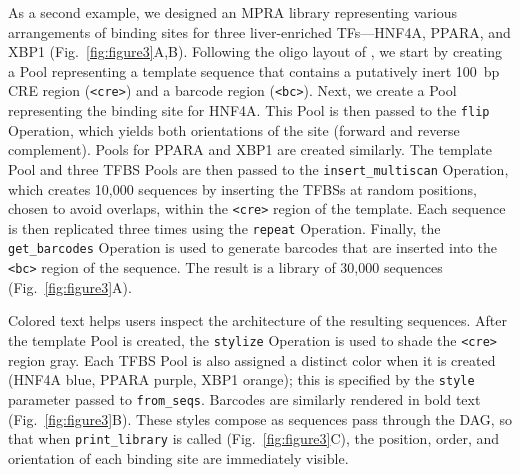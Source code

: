 \documentclass[twoside]{kinneylab_preprintstyle}
\begin{document}
As a second example, we designed an MPRA library representing various arrangements of binding sites for three liver-enriched TFs---HNF4A, PPARA, and XBP1 (Fig.~\ref{fig:figure3}A,B). Following the oligo layout of \citet{Melnikov2012dw}, we start by creating a Pool representing a template sequence that contains a putatively inert 100~bp CRE region (\texttt{<cre>}) and a barcode region (\texttt{<bc>}). Next, we create a Pool representing the binding site for HNF4A. This Pool is then passed to the \texttt{flip} Operation, which yields both orientations of the site (forward and reverse complement). Pools for PPARA and XBP1 are created similarly. The template Pool and three TFBS Pools are then passed to the \texttt{insert\_multiscan} Operation, which creates 10,000 sequences by inserting the TFBSs at random positions, chosen to avoid overlaps, within the \texttt{<cre>} region of the template. Each sequence is then replicated three times using the \texttt{repeat} Operation. Finally, the \texttt{get\_barcodes} Operation is used to generate barcodes that are inserted into the \texttt{<bc>} region of the sequence. The result is a library of 30,000 sequences (Fig.~\ref{fig:figure3}A). 

Colored text helps users inspect the architecture of the resulting sequences. After the template Pool is created, the \texttt{stylize} Operation is used to shade the \texttt{<cre>} region gray. Each TFBS Pool is also assigned a distinct color when it is created (HNF4A blue, PPARA purple, XBP1 orange); this is specified by the \texttt{style} parameter passed to \texttt{from\_seqs}. Barcodes are similarly rendered in bold text (Fig.~\ref{fig:figure3}B). These styles compose as sequences pass through the DAG, so that when \texttt{print\_library} is called (Fig.~\ref{fig:figure3}C), the position, order, and orientation of each binding site are immediately visible.
\end{document}
